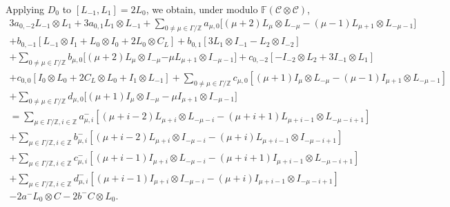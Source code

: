 \documentclass{amsart}
\theoremstyle{definition}
\theoremstyle{remark}
\numberwithin{equation}{subsection}
\numberwithin{equation}{section}
\begin{document}
Applying $D_0$  to $[L_{-1},L_1]=2L_0$, we obtain, under modulo
$\mathbb{F} (\mathcal {C}\otimes \mathcal {C})$,
$$\begin{array}{ll}
3a_{0,-2}L_{-1}\otimes L_1+ 3a_{0,1}L_1\otimes L_{-1}+
 \underset{0\neq\mu\in \Gamma/\mathbb{Z}}{\sum}{a_{\mu,0}[(\mu+2)L_\mu \otimes
 L_{-\mu}}-(\mu-1) L_{\mu+1}\otimes L_{-\mu-1}]   \\[12pt]
  + b_{0,-1}[L_{-1}\otimes I_1+L_0\otimes I_0+2L_0\otimes C_L] + b_{0,1}[3L_1\otimes
  I_{-1} -L_2\otimes I_{-2}]     \\[12pt]
  +\underset{0\neq\mu\in \Gamma/\mathbb{Z}}{\sum}{b_{\mu,0}
[(\mu+2) L_\mu \otimes I_{-\mu}} {-\mu L_{\mu+1}\otimes I_{-\mu-1}]}
 + c_{0,-2}[-I_{-2}\otimes L_2+3I_{-1}\otimes L_1 ]   \\[12pt]
 + c_{0,0}[I_0 \otimes
 L_0+2C_L\otimes L_0+I_1\otimes L_{-1}]
 +\underset{0\neq\mu\in \Gamma/\mathbb{Z}}{\sum}c_{\mu,0}[(\mu+1)I_\mu
  \otimes L_{-\mu}-(\mu-1)I_{\mu+1}\otimes L_{-\mu-1}]   \\[12pt]
+\underset{0\neq\mu\in
\Gamma/\mathbb{Z}}{\sum}{d_{\mu,0}[(\mu+1)I_\mu \otimes
I_{-\mu}-\mu I_{\mu+1}\otimes I_{-\mu-1}}]     \\[12pt]
=\underset{\mu\in \Gamma/\mathbb{Z},i\in
\mathbb{Z}}{\sum}{a^{-}_{\mu,i} [(\mu+i-2)L_{\mu+i} \otimes L_{-\mu-i}-(\mu+i+1)L_{\mu+i-1}\otimes L_{-\mu-i+1}]}  \\[12pt]
+\underset{\mu\in \Gamma/\mathbb{Z},i\in
\mathbb{Z}}{\sum}{b^{-}_{\mu,i} [(\mu+i-2)L_{\mu+i} \otimes I_{-\mu-i}-(\mu+i)L_{\mu+i-1}\otimes I_{-\mu-i+1}]}   \\[12pt]
+\underset{\mu\in \Gamma/\mathbb{Z},i\in
 \mathbb{Z}}{\sum}{c^{-}_{\mu,i} [(\mu+i-1)I_{\mu+i} \otimes L_{-\mu-i}-(\mu+i+1)I_{\mu+i-1}\otimes L_{-\mu-i+1}]}   \\[12pt]
+ \underset{\mu\in \Gamma/\mathbb{Z},i\in
 \mathbb{Z}}{\sum}{d^{-}_{\mu,i} [(\mu+i-1)I_{\mu+i} \otimes I_{-\mu-i}-(\mu+i)I_{\mu+i-1}\otimes I_{-\mu-i+1}]}    \\[12pt]
-2a^{-} L_0\otimes C-2 b^{-} C\otimes L_0.
\end{array}$$
\end{document}
